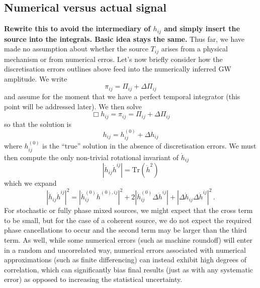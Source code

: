 \documentclass{revtex4}
\begin{document}
\subsection{Numerical versus actual signal}
{\bf Rewrite this to avoid the intermediary of $h_{ij}$ and simply insert the source into the integrals.  Basic idea stays the same.}
Thus far, we have made no assumption about whether the source $T_{ij}$ arises from a physical mechanism or from numerical erros.  Let's now briefly consider how the discretisation errors outlines above feed into the numerically inferred GW amplitude.
We write
\begin{equation}
  \pi_{ij} = \Pi_{ij} + \Delta\Pi_{ij}
\end{equation}
and assume for the moment that we have a perfect temporal integrator (this point will be addressed later).
We then solve
\begin{equation}
  \Box h_{ij} = \pi_{ij} = \Pi_{ij} + \Delta\Pi_{ij}
\end{equation}
so that the solution is
\begin{equation}
  h_{ij} = h_{ij}^{(0)} + \Delta h_{ij}
\end{equation}
where $h_{ij}^{(0)}$ is the ``true'' solution in the absence of discretisation errors.
We must then compute the only non-trivial rotational invariant of $\dot{h}_{ij}$
\begin{equation}
  \left|\dot{h}_{ij}\dot{h}^{ij}\right| = \mathrm{Tr}\left(\dot{h}^2\right)
\end{equation}
which we expand
\begin{equation}
  \left|\dot{h}_{ij}\dot{h}^{ij} \right|^2 = \left|\dot{h}_{ij}^{(0)}\dot{h}^{(0),ij}\right|^2 + 2\left|\dot{h}_{ij}^{(0)}\Delta\dot{h}^{ij}\right| + \left|\Delta\dot{h}_{ij}\Delta\dot{h}^{ij}\right|^2 \, .
\end{equation}
For stochastic or fully phase mixed sources, we might expect that the cross term to be small, but for the case of a coherent source, we do not expect the required phase cancellations to occur and the second term may be larger than the third term.  As well, while some numerical errors (such as machine roundoff) will enter in a random and uncorrelated way, numerical errors associated with numerical approximations (such as finite differencing) can instead exhibit high degrees of correlation, which can significantly bias final results (just as with any systematic error) as opposed to increasing the statistical uncertainty.
\end{document}
